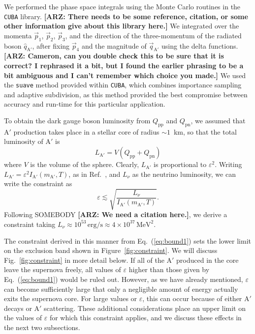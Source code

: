 \documentclass[nofootinbib,prd,superscriptaddress,twocolumn]{revtex4}
\newcommand{\Aprime}{\mathrm{A}'}
\newcommand{\arz}[1]{{{\bf{\color{BrickRed}[ARZ: #1]}}}}
\begin{document}
We performed the phase space integrals using the Monte Carlo routines in the {\tt CUBA} library. 
\arz{There needs to be some reference, citation, or some other information give about this library here.} 
We integrated over the momenta $\vec{p}_1$, $\vec{p}_2$, $\vec{p}_3$, and the direction of the 
three-momentum of the radiated boson $\hat{q}_{\mathrm{A}'}$, after fixing $\vec{p}_4$ 
and the magnitude of $\vec{q}_{\mathrm{A}'}$ using the delta functions. 
\arz{Cameron, can you double check this to be sure that it is correct? I rephrased it a bit, 
but I found the earlier phrasing to be a bit ambiguous and I can't remember which choice 
you made.} We used the {\tt suave} method provided within {\tt CUBA}, which combines 
importance sampling and adaptive subdivision, as this method provided the best compromise 
between accuracy and run-time for this particular application.

To obtain the dark gauge boson luminosity from $Q_{\mathrm{pp}}$ and $Q_{\mathrm{pn}}$, 
we assumed that $\Aprime$ production takes place in a stellar core of radius $\sim 1$~km, so that 
the total luminosity of $\Aprime$ is 
%
\begin{equation}
L_{\mathrm{A}'} = V (Q_{\mathrm{pp}} + Q_{\mathrm{pn}})
\end{equation}
%
where $V$ is the volume of the sphere. Clearly, $L_{\mathrm{A}'}$ is proportional to $\varepsilon^2$. 
Writing $L_{\mathrm{A}'} = \varepsilon^2 I_{\mathrm{A}'}(m_{\mathrm{A}'},T)$, as in Ref.~\cite{dent_etal12}, 
and $L_{\nu}$ as the neutrino luminosity, we can write the constraint as 
%
\begin{equation}
\label{eq:bound1}
\varepsilon \lesssim \sqrt{\frac{L_{\nu}}{I_{\mathrm{A}'}(m_{\mathrm{A}'}, T)}}.
\end{equation}
%
Following SOMEBODY \arz{We need a citation here.}, we derive a constraint taking 
$L_{\nu} \approx 10^{53}\, \mathrm{erg/s} \approx 4 \times 10^{37}\, \mathrm{MeV}^2$. 


The constraint derived in this manner from Eq.~(\ref{eq:bound1}) sets the lower limit on the 
exclusion band shown in Figure~\ref{fig:constraint}. We will discuss Fig.~\ref{fig:constraint} 
in more detail below. If all of the $\Aprime$ produced in the core leave the supernova freely, all 
values of $\varepsilon$ higher than those given by Eq.~(\ref{eq:bound1}) would be ruled out. 
However, as we have already mentioned, $\varepsilon$ can become sufficiently large that only a 
negligible amount of energy actually exits the supernova core. For large values or $\varepsilon$, 
this can occur because of either $\Aprime$ decays or $\Aprime$ scattering. These additional considerations place 
an upper limit on the values of $\varepsilon$ for which this constraint applies, 
and we discuss these effects in the next two subsections.
\end{document}

